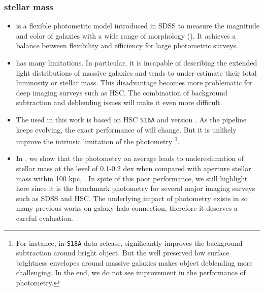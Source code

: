 \documentclass[a4paper,fleqn,usenatbib]{mnras}
\begin{document}
\subsubsection{\cmodel{} stellar mass}
    \label{sec:mcmodel}


    \begin{itemize}

        \item \cmodel{} is a flexible photometric model introduced in SDSS to measure the magnitude
            and color of galaxies with a wide range of morphology (\addref{}).
            It achieves a balance between flexibility and efficiency for large photometric surveys.

        \item \cmodel{} has many limitations. In particular, it is incapable of describing the
            extended light distributions of massive galaxies and tends to under-estimate their
            total luminosity or stellar mass.
            This disadvantage becomes more problematic for deep imaging surveys such as HSC.
            The combination of background subtraction and deblending issues will make it even more
            difficult.

        \item The \mcmodel{} used in this work is based on HSC \texttt{S16A} and \hscpipe{}
            version {\color{red}{XXX}}. As the pipeline keeps evolving, the exact performance of
            \cmodel{} will change. But it is unlikely improve the intrinsic limitation of
            the \cmodel{} photometry \footnote{
            For instance, in {\tt S18A} data release, \hscpipe{} significantly improves the
            background subtraction around bright object. But the well preserved low surface
            brightness envelopes around massive galaxies makes object deblending more challenging.
            In the end, we do not see improvement in the performance of \cmodel{} photometry.
            }.

        \item In \citet{Huang2018b}, we show that the \cmodel{} photometry on average leads to
            underestimation of stellar mass at the level of 0.1-0.2 dex when compared with
            aperture stellar mass within 100 kpc, \mtot{}.
            In spite of this poor performance, we still highlight \cmodel{} here since it is the
            benchmark photometry for several major imaging surveys such as SDSS and HSC.
            The underlying impact of \cmodel{} photometry exists in so many previous works on
            galaxy-halo connection, therefore it deserves a careful evaluation.

    \end{itemize}
\end{document}
